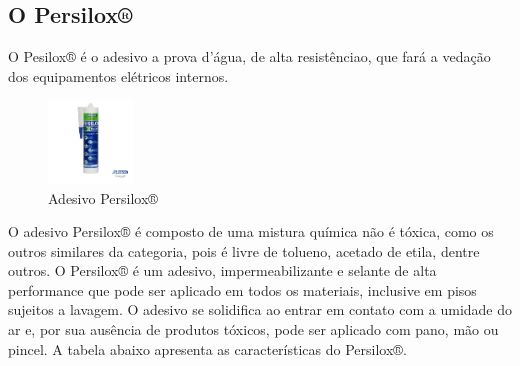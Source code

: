 \subsection{O Persilox®}
O  Pesilox® é o adesivo a prova d’água, de alta resistênciao, que fará a vedação dos equipamentos elétricos internos.
\par
\begin{figure}[h]
  \centering
  \includegraphics[width=0.2\textwidth]{figures/persilox.png}
  \caption{Adesivo Persilox®}
  \label{fig:persilox}
\end{figure}
\FloatBarrier
\par
O adesivo Persilox® é composto de uma mistura química não é tóxica, como os outros similares da categoria, pois é livre de tolueno, acetado de etila, dentre outros. O Persilox® é um adesivo, impermeabilizante e selante de alta performance que pode ser aplicado em todos os materiais, inclusive em pisos sujeitos a lavagem. O adesivo se solidifica ao entrar em contato com a umidade do ar e, por sua ausência de produtos tóxicos, pode ser aplicado com pano, mão ou pincel. A tabela abaixo apresenta as características do Persilox®.

